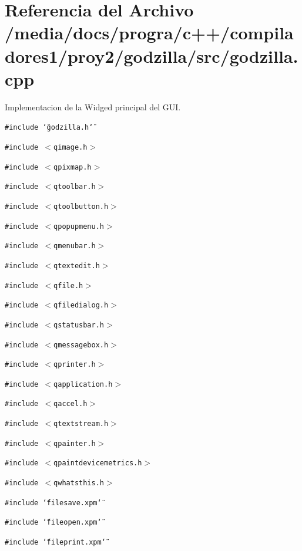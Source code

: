 \section{Referencia del Archivo /media/docs/progra/c++/compiladores1/proy2/godzilla/src/godzilla.cpp}
\label{godzilla_8cpp}
Implementacion de la Widged principal del GUI. 

{\tt \#include \char`\"{}godzilla.h\char`\"{}}\par
{\tt \#include $<$qimage.h$>$}\par
{\tt \#include $<$qpixmap.h$>$}\par
{\tt \#include $<$qtoolbar.h$>$}\par
{\tt \#include $<$qtoolbutton.h$>$}\par
{\tt \#include $<$qpopupmenu.h$>$}\par
{\tt \#include $<$qmenubar.h$>$}\par
{\tt \#include $<$qtextedit.h$>$}\par
{\tt \#include $<$qfile.h$>$}\par
{\tt \#include $<$qfiledialog.h$>$}\par
{\tt \#include $<$qstatusbar.h$>$}\par
{\tt \#include $<$qmessagebox.h$>$}\par
{\tt \#include $<$qprinter.h$>$}\par
{\tt \#include $<$qapplication.h$>$}\par
{\tt \#include $<$qaccel.h$>$}\par
{\tt \#include $<$qtextstream.h$>$}\par
{\tt \#include $<$qpainter.h$>$}\par
{\tt \#include $<$qpaintdevicemetrics.h$>$}\par
{\tt \#include $<$qwhatsthis.h$>$}\par
{\tt \#include \char`\"{}filesave.xpm\char`\"{}}\par
{\tt \#include \char`\"{}fileopen.xpm\char`\"{}}\par
{\tt \#include \char`\"{}fileprint.xpm\char`\"{}}\par



